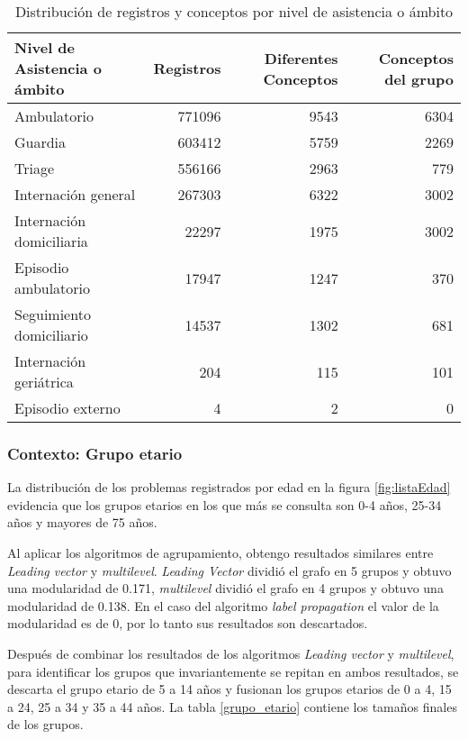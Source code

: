 \begin{table}[htb]
\centering
\caption{Distribución de registros y conceptos por nivel de asistencia o ámbito }
\label{nivel_asistencia}
\begin{tabular}{@{}lrrr@{}}
\toprule
Nivel de Asistencia o ámbito & Registros & Diferentes Conceptos& Conceptos del grupo \\ \midrule
Ambulatorio & \num{771096} & \num{9543}& \num{6304} \\
Guardia & \num{603412} & \num{5759}& \num{2269} \\
Triage & \num{556166} & \num{2963}& \num{779} \\
Internación general & \num{267303} & \num{6322}& \num{3002} \\
Internación domiciliaria & \num{22297} & \num{1975} & \num{3002}\\
Episodio ambulatorio & \num{17947} & \num{1247}& \num{370} \\
Seguimiento domiciliario & \num{14537} & \num{1302} & \num{681}\\
Internación geriátrica & \num{204} & \num{115}& \num{101} \\
Episodio externo & \num{4} & \num{2} & \num{0}\\ \bottomrule
\end{tabular}
\end{table}


\subsubsection{Contexto: Grupo etario}
La distribución de los problemas registrados por edad en la figura \ref{fig:listaEdad} evidencia que los grupos etarios en los que más se consulta son 0-4 años, 25-34 años y mayores de 75 años.

Al aplicar los algoritmos de agrupamiento, obtengo resultados similares entre \textit{Leading vector} y \textit{multilevel}. \textit{Leading Vector} dividió el grafo en 5 grupos y obtuvo una modularidad de \num{0.171}, \textit{multilevel} dividió el grafo en 4 grupos y obtuvo una modularidad de \num{0.138}. En el caso del algoritmo \textit{label propagation} el valor de la modularidad es de 0, por lo tanto sus resultados son descartados.

Después de combinar los resultados de los algoritmos \textit{Leading vector} y \textit{multilevel}, para identificar los grupos que invariantemente se repitan en ambos resultados, se descarta el grupo etario de 5 a 14 años y fusionan los grupos etarios de 0 a 4, 15 a 24, 25 a 34 y 35 a 44 años. La tabla \ref{grupo_etario} contiene los tamaños finales de los grupos.

